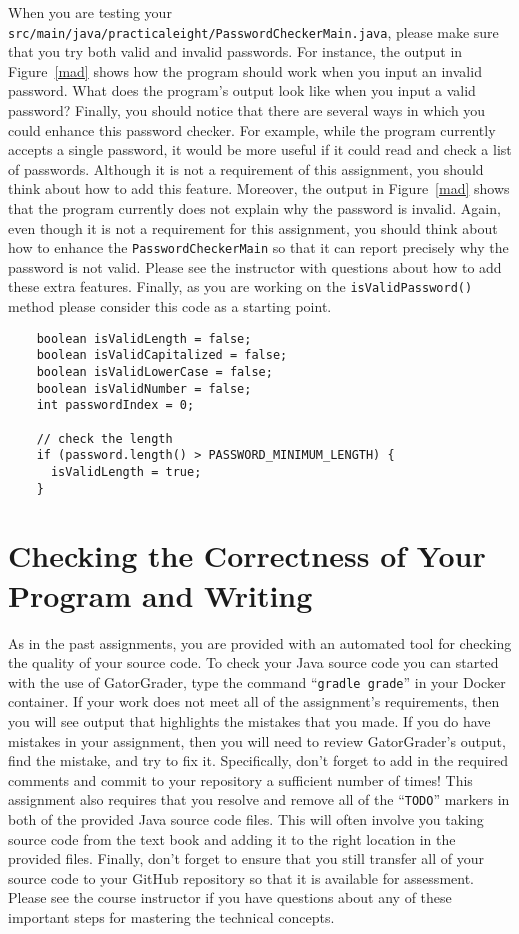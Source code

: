 \documentclass[11pt]{article}
\newcommand{\mainprogramsource}{\lstinline{src/main/java/practicaleight/PasswordCheckerMain.java}}
\newcommand{\gatorgraderstart}{\command{gradle grade}}
\newcommand{\command}[1]{``\lstinline{#1}''}
\newcommand{\program}[1]{\lstinline{#1}}
\begin{document}
When you are testing your \mainprogramsource{}, please make sure that you try
both valid and invalid passwords. For instance, the output in Figure~\ref{mad}
shows how the program should work when you input an invalid password. What does
the program's output look like when you input a valid password? Finally, you
should notice that there are several ways in which you could enhance this
password checker. For example, while the program currently accepts a single
password, it would be more useful if it could read and check a list of
passwords. Although it is not a requirement of this assignment, you should think
about how to add this feature. Moreover, the output in Figure~\ref{mad} shows
that the program currently does not explain why the password is invalid. Again,
even though it is not a requirement for this assignment, you should think about
how to enhance the {\tt PasswordCheckerMain} so that it can report precisely why
the password is not valid. Please see the instructor with questions about how to
add these extra features.
%
Finally, as you are working on the \program{isValidPassword()} method please
consider this code as a starting point.

\begin{verbatim}
    boolean isValidLength = false;
    boolean isValidCapitalized = false;
    boolean isValidLowerCase = false;
    boolean isValidNumber = false;
    int passwordIndex = 0;

    // check the length
    if (password.length() > PASSWORD_MINIMUM_LENGTH) {
      isValidLength = true;
    }
\end{verbatim}

\section*{Checking the Correctness of Your Program and Writing}

As in the past assignments, you are provided with an automated tool for checking
the quality of your source code. To check your Java source code you can started
with the use of GatorGrader, type the command \gatorgraderstart{} in your Docker
container. If your work does not meet all of the assignment's requirements, then
you will see output that highlights the mistakes that you made. If you do have
mistakes in your assignment, then you will need to review GatorGrader's output,
find the mistake, and try to fix it. Specifically, don't forget to add in the
required comments and commit to your repository a sufficient number of times!
This assignment also requires that you resolve and remove all of the
\command{TODO} markers in both of the provided Java source code files. This will
often involve you taking source code from the text book and adding it to the
right location in the provided files. Finally, don't forget to ensure that you
still transfer all of your source code to your GitHub repository so that it is
available for assessment. Please see the course instructor if you have questions
about any of these important steps for mastering the technical concepts.
\end{document}
